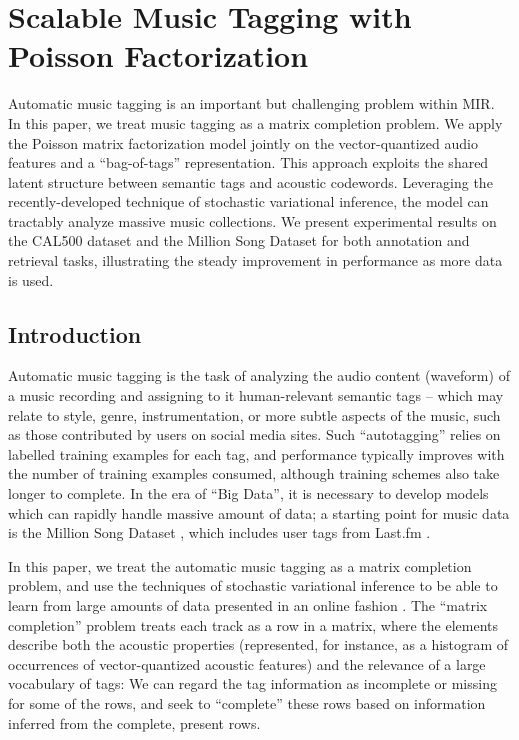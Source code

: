 
\chapter{Scalable Music Tagging with Poisson Factorization}


\def\etal{\emph{et al.}}

Automatic music tagging is an important but challenging problem within MIR. In this paper, we treat music tagging as a matrix completion problem. We apply the Poisson matrix factorization model jointly on the vector-quantized audio features and a ``bag-of-tags'' representation. This approach exploits the shared latent structure between semantic tags and acoustic codewords. Leveraging the recently-developed technique of stochastic variational inference, the model can tractably analyze massive music collections. We present experimental results on the CAL500 dataset and the Million Song Dataset for both annotation and retrieval tasks, illustrating the steady improvement in performance as more data is used. 
%
\section{Introduction}\label{sec:intro}

Automatic music tagging is the task of analyzing the audio content (waveform) of a music recording and assigning to it human-relevant semantic tags \cite{Turnbull_SemanticAudio} -- which may relate to style, genre, instrumentation, or more subtle aspects of the music, such as those contributed by users on social media sites.  Such ``autotagging'' \cite{eck2007automatic} relies on labelled training examples for each tag, and performance typically improves with the number of training examples consumed, although training schemes also take longer to complete.  In the era of ``Big Data'', it is necessary to develop models which can rapidly handle massive amount of data; a starting point for music data is the Million Song Dataset \cite{bertin2011million}, which includes user tags from Last.fm \cite{lastfm}.

In this paper, we treat the automatic music tagging as a matrix completion problem, and use the 
techniques of stochastic variational inference to be able to learn from large amounts of data presented 
in an online fashion \cite{hoffman2013stochastic}.  The ``matrix completion'' problem treats each track as a row in a matrix, where the elements describe both the acoustic properties (represented, for instance, as a histogram of occurrences of vector-quantized acoustic features) and the relevance of a large vocabulary of tags: We can regard the tag information as incomplete or missing for some of the rows, and seek to ``complete'' these rows based on information inferred from the complete, present rows.


